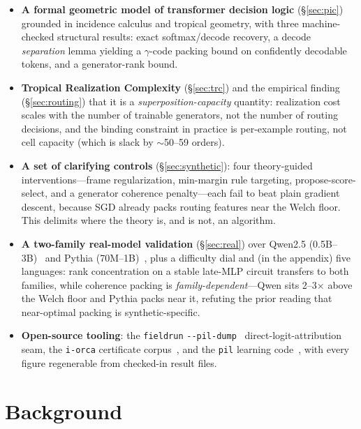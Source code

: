 \documentclass[sigconf,nonacm]{acmart}
\theoremstyle{definition}
\begin{document}
\begin{itemize}
\item \textbf{A formal geometric model of transformer decision logic}
(\S\ref{sec:pic}) grounded in incidence calculus and tropical geometry, with three
machine-checked structural results: exact softmax/decode recovery, a decode
\emph{separation} lemma yielding a $\gamma$-code packing bound on confidently
decodable tokens, and a generator-rank bound.
\item \textbf{Tropical Realization Complexity} (\S\ref{sec:trc}) and the empirical
finding (\S\ref{sec:routing}) that it is a \emph{superposition-capacity} quantity:
realization cost scales with the number of trainable generators, not the number of
routing decisions, and the binding constraint in practice is per-example routing,
not cell capacity (which is slack by $\sim$50--59 orders).
\item \textbf{A set of clarifying controls} (\S\ref{sec:synthetic}): four
theory-guided interventions---frame regularization, min-margin rule targeting,
propose-score-select, and a generator coherence penalty---each fail to beat plain
gradient descent, because SGD already packs routing features near the Welch floor.
This delimits where the theory is, and is not, an algorithm.
\item \textbf{A two-family real-model validation} (\S\ref{sec:real}) over Qwen2.5
(0.5B--3B)~\cite{qwen2025} and Pythia (70M--1B)~\cite{biderman2023pythia}, plus a
difficulty dial and (in the appendix) five languages: rank concentration on a stable
late-MLP circuit transfers to both families, while coherence packing is
\emph{family-dependent}---Qwen sits 2--3$\times$ above the Welch floor and Pythia
packs near it, refuting the prior reading that near-optimal packing is
synthetic-specific.
\item \textbf{Open-source tooling}: the \texttt{fieldrun}
\texttt{-{}-pil-dump}~\cite{fieldrun} direct-logit-attribution seam, the
\texttt{i-orca} certificate corpus~\cite{iorca}, and the \texttt{pil} learning
code~\cite{pil}, with every figure regenerable from checked-in result files.
\end{itemize}

\section{Background}
\end{document}
